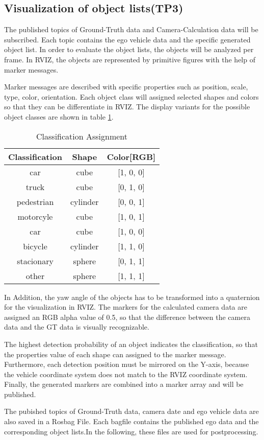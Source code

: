 \subsection{Visualization of object lists(TP3)}

The published topics of Ground-Truth data and Camera-Calculation data will be subscribed. Each topic contains the ego vehicle data and the specific generated object list. In order to evaluate the object lists, the objects will be analyzed per frame. In RVIZ, the objects are represented by primitive figures with the help of marker messages.



Marker messages are described with specific properties such as position, scale, type, color, orientation. Each object class will assigned selected shapes and colors so that they can be differentiate in RVIZ. The display variants for the possible object classes are shown in table \ref{ClassificationAssignment}. 

\begin{table}[h]
\caption{Classification Assignment}
\label{ClassificationAssignment}
\begin{center}
\begin{tabular}{c c c}
\hline
Classification & Shape & Color[RGB]\\
\hline
car & cube & [1, 0, 0]\\
truck & cube & [0, 1, 0]\\
pedestrian & cylinder & [0, 0, 1]\\
motorcyle & cube & [1, 0, 1]\\
car & cube & [1, 0, 0]\\
bicycle & cylinder & [1, 1, 0]\\
stacionary & sphere & [0, 1, 1]\\
other & sphere & [1, 1, 1]\\
\hline


\end{tabular}
\end{center}
\end{table}

In Addition, the yaw angle of the objects has to be transformed into a quaternion for the visualization in RVIZ. The markers for the calculated camera data are assigned an RGB alpha value of 0.5, so that the difference between the camera data and the GT data is visually recognizable. 

The highest detection probability of an object indicates the classification, so that the properties value of each shape can assigned to the marker message. Furthermore, each detection position must be mirrored on the Y-axis, because the vehicle coordinate system does not match to the RVIZ coordinate system. Finally, the generated markers are combined into a marker array and will be published.

The pubished topics of Ground-Truth data, camera date and ego vehicle data are also saved in a Rosbag File. Each bagfile contains the published ego data and the corresponding object lists.In the following, these files are used for postprocessing.